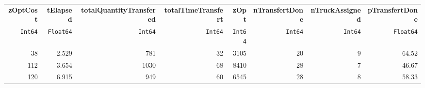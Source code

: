 \begin{tabular}{rrrrrrrr}
  \hline
  \textbf{zOptCost} & \textbf{tElapsed} & \textbf{totalQuantityTransfered} & \textbf{totalTimeTransfert} & \textbf{zOpt} & \textbf{nTransfertDone} & \textbf{nTruckAssigned} & \textbf{pTransfertDone} \\
  \texttt{Int64} & \texttt{Float64} & \texttt{Int64} & \texttt{Int64} & \texttt{Int64} & \texttt{Int64} & \texttt{Int64} & \texttt{Float64} \\\hline
  38 & 2.529 & 781 & 32 & 3105 & 20 & 9 & 64.52 \\
  112 & 3.654 & 1030 & 68 & 8410 & 28 & 7 & 46.67 \\
  120 & 6.915 & 949 & 60 & 6545 & 28 & 8 & 58.33 \\\hline
\end{tabular}
